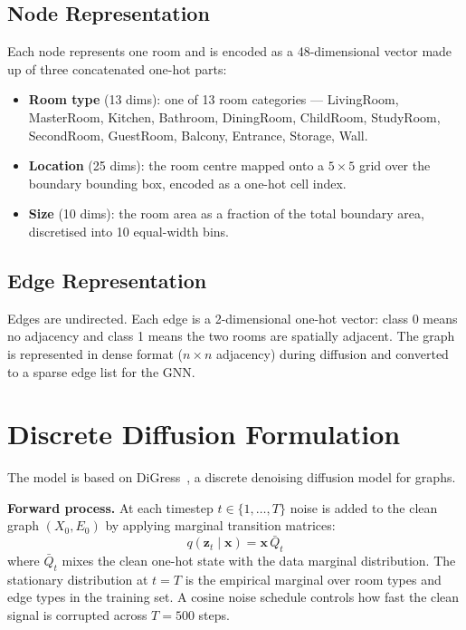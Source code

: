 \documentclass[11pt]{article}
\begin{document}
\subsection{Node Representation}

Each node represents one room and is encoded as a 48-dimensional vector made up of three concatenated one-hot parts:

\begin{itemize}
    \item \textbf{Room type} (13 dims): one of 13 room categories — LivingRoom, MasterRoom, Kitchen, Bathroom, DiningRoom, ChildRoom, StudyRoom, SecondRoom, GuestRoom, Balcony, Entrance, Storage, Wall.
    \item \textbf{Location} (25 dims): the room centre mapped onto a $5 \times 5$ grid over the boundary bounding box, encoded as a one-hot cell index.
    \item \textbf{Size} (10 dims): the room area as a fraction of the total boundary area, discretised into 10 equal-width bins.
\end{itemize}

\subsection{Edge Representation}

Edges are undirected. Each edge is a 2-dimensional one-hot vector: class 0 means no adjacency and class 1 means the two rooms are spatially adjacent. The graph is represented in dense format ($n \times n$ adjacency) during diffusion and converted to a sparse edge list for the GNN.

\section{Discrete Diffusion Formulation}

The model is based on DiGress~\cite{vignac2022digress}, a discrete denoising diffusion model for graphs.

\textbf{Forward process.} At each timestep $t \in \{1, \ldots, T\}$ noise is added to the clean graph $(X_0, E_0)$ by applying marginal transition matrices:
\[
q(\mathbf{z}_t \mid \mathbf{x}) = \mathbf{x} \, \bar{Q}_t
\]
where $\bar{Q}_t$ mixes the clean one-hot state with the data marginal distribution. The stationary distribution at $t = T$ is the empirical marginal over room types and edge types in the training set. A cosine noise schedule controls how fast the clean signal is corrupted across $T = 500$ steps.
\end{document}

